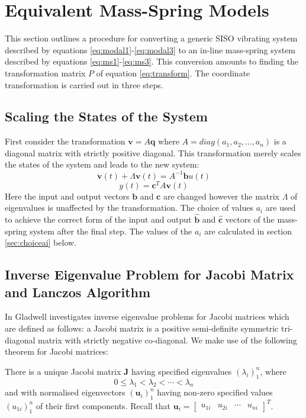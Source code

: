 \documentclass{mbd_fullpaper}
\begin{document}
\section{Equivalent Mass-Spring Models}
\label{sec:algorithms}
This section outlines a procedure for converting a generic SISO vibrating system described by equations \ref{eq:modal1}-\ref{eq:modal3} to an in-line mass-spring system described by equations \ref{eq:ms1}-\ref{eq:ms3}.
This conversion amounts to finding the transformation matrix $P$ of equation \ref{eq:transform}.
The coordinate transformation is carried out in three steps.

\subsection{Scaling the States of the System}
First consider the transformation $\mathbf{v} = A \mathbf{q}$ where $A = diag(a_1, a_2, ..., a_n)$ is a diagonal matrix with strictly positive diagonal.
This transformation merely scales the states of the system and leads to the new system:
\begin{equation}
\ddot{\mathbf{v}}(t) +  \Lambda \mathbf{v}(t) =  A^{-1} \mathbf{b}u(t)
\label{eq:scaled1}
\end{equation}
\begin{equation}
y(t) = \mathbf{c}^T  A \mathbf{v}(t)
\label{eq:scaled2}
\end{equation}
Here the input and output vectors $\mathbf{b}$ and $\mathbf{c}$ are changed however the matrix $\Lambda$ of eigenvalues is unaffected by the transformation.
The choice of values $a_i$ are used to achieve the correct form of the input and output $\mathbf{\hat{b}}$ and $\mathbf{\hat{c}}$ vectors of the mass-spring system after the final step.
The values of the $a_i$ are calculated in section \ref{sec:choiceai} below.

\subsection{Inverse Eigenvalue Problem for Jacobi Matrix and Lanczos Algorithm}
In \cite{gladwell1986inverse} Gladwell investigates inverse eigenvalue problems for Jacobi matrices which are defined as follows:
a Jacobi matrix is a positive semi-definite symmetric tri-diagonal matrix with strictly negative co-diagonal.
We make use of the following theorem for Jacobi matrices:

There is a unique Jacobi matrix $\mathbf{J}$ having specified eigenvalues $(\lambda_i)_1^n$, where
\begin{equation}
0 \leq \lambda_1<\lambda_2< \cdots <\lambda_n
\label{eq:lambda}
\end{equation}
and with normalised eigenvectors $(\mathbf{u}_i)_1^n$  having non-zero specified values $(u_{1i})_1^n$ of their first components.
Recall that $\mathbf{u}_i = \begin{bmatrix} u_{1i} &  u_{2i} & \cdots & u_{ni} \end{bmatrix}^T$.
\end{document}
